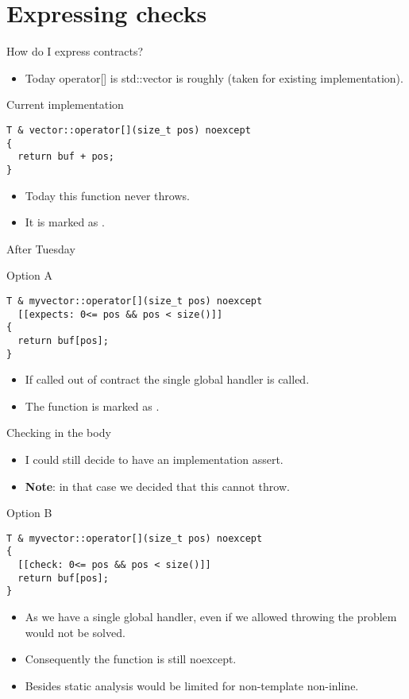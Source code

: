 \section{Expressing checks}

\begin{frame}[t,fragile]{How do I express contracts?}
\begin{itemize}
  \item Today operator[] is std::vector is roughly (taken for existing implementation).
\end{itemize}
\begin{block}{Current implementation}
\begin{lstlisting}
T & vector::operator[](size_t pos) noexcept
{
  return buf + pos;
}
\end{lstlisting}
\end{block}
\begin{itemize}
  \item Today this function never throws.
  \item It is marked as .
\end{itemize}
\end{frame}

\begin{frame}[t,fragile]{After Tuesday}
\begin{block}{Option A}
\begin{lstlisting}
T & myvector::operator[](size_t pos) noexcept
  [[expects: 0<= pos && pos < size()]]
{
  return buf[pos];
}
\end{lstlisting}
\end{block}
\begin{itemize}
  \item If called out of contract the single global handler is called.
  \item The function is marked as .
\end{itemize}
\end{frame}

\begin{frame}[t,fragile]{Checking in the body}
\begin{itemize}
 \item I could still decide to have an implementation assert. 
 \item \textbf{Note}: in that case we decided that this cannot throw. 
\end{itemize}
\begin{block}{Option B}
\begin{lstlisting}
T & myvector::operator[](size_t pos) noexcept
{
  [[check: 0<= pos && pos < size()]]
  return buf[pos];
}
\end{lstlisting}
\end{block}
\begin{itemize}
  \item As we have a single global handler, even if we allowed throwing the problem
would not be solved. 
  \item Consequently the function is still noexcept.
  \item Besides static analysis would be limited for non-template non-inline.
\end{itemize}
\end{frame}

